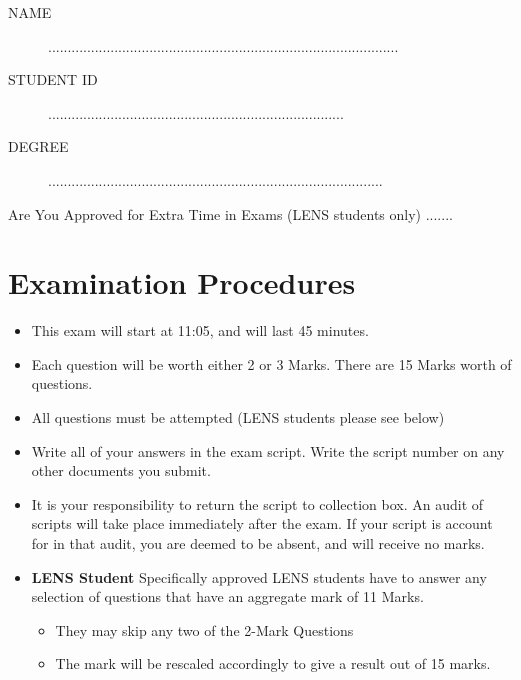 \documentclass[11pt]{article} %
\begin{document}
	
	
	\Large
\newpage

\begin{framed}
\begin{description}
\item[NAME]  ..........................................................................................
\bigskip
\item[STUDENT ID] ............................................................................
\bigskip
\item[DEGREE] ......................................................................................
\end{description}
\end{framed}
Are You Approved for Extra Time in Exams (LENS students only)  .......
\section*{Examination Procedures}

\begin{itemize} 
	\item This exam will start at 11:05, and will last 45 minutes.
	
	\item Each question will be worth either 2 or 3 Marks. There are 15 Marks worth of questions.
	\item All questions must be attempted (LENS students please see below)
	
	\item Write all of your answers in the exam script. Write the script number on any other documents you submit.
	
	\item It is your responsibility to return the script to collection box. An audit of scripts will take place immediately after the exam. If your script is account for in that audit,  you are deemed to be absent, and will receive no marks.
	
	\item \textbf{LENS Student}
	Specifically approved LENS students have to answer any selection of questions that have an aggregate mark of 11 Marks.  
	\begin{itemize}
		\item They may skip any two of the 2-Mark Questions
		\item The mark will be rescaled accordingly to give a result out of 15 marks.
	\end{itemize}
	
	
\end{itemize}
\end{document}
